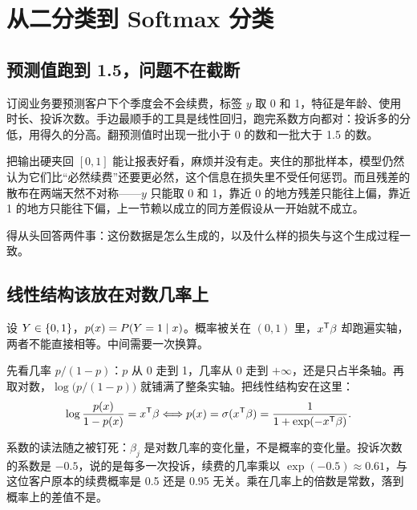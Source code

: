\section{从二分类到 Softmax 分类}
\label{sec:13-Machine-Learning/02-Linear-Models/03}

\subsection{预测值跑到 1.5，问题不在截断}

订阅业务要预测客户下个季度会不会续费，标签 \(y\) 取 0 和 1，特征是年龄、使用时长、投诉次数。手边最顺手的工具是线性回归，跑完系数方向都对：投诉多的分低，用得久的分高。翻预测值时出现一批小于 0 的数和一批大于 1.5 的数。

把输出硬夹回 \([0,1]\) 能让报表好看，麻烦并没有走。夹住的那批样本，模型仍然认为它们比``必然续费''还要更必然，这个信息在损失里不受任何惩罚。而且残差的散布在两端天然不对称——\(y\) 只能取 0 和 1，靠近 0 的地方残差只能往上偏，靠近 1 的地方只能往下偏，上一节赖以成立的同方差假设从一开始就不成立。

得从头回答两件事：这份数据是怎么生成的，以及什么样的损失与这个生成过程一致。

\subsection{线性结构该放在对数几率上}

设 \(Y\in\left\{0,1\right\}\)，\(p(x)=P(Y=1\mid x)\)。概率被关在 \((0,1)\) 里，\(x^{\mathsf{T}}\beta\) 却跑遍实轴，两者不能直接相等。中间需要一次换算。

先看几率 \(p/(1-p)\)：\(p\) 从 0 走到 1，几率从 0 走到 \(+\infty\)，还是只占半条轴。再取对数，\(\log\bigl(p/(1-p)\bigr)\) 就铺满了整条实轴。把线性结构安在这里：
\[
\log\frac{p(x)}{1-p(x)}=x^{\mathsf{T}}\beta
\space\Longleftrightarrow\space
p(x)=\sigma(x^{\mathsf{T}}\beta)=\frac{1}{1+\exp(-x^{\mathsf{T}}\beta)} .
\]

系数的读法随之被钉死：\(\beta_j\) 是对数几率的变化量，不是概率的变化量。投诉次数的系数是 \(-0.5\)，说的是每多一次投诉，续费的几率乘以 \(\exp(-0.5)\approx 0.61\)，与这位客户原本的续费概率是 0.5 还是 0.95 无关。乘在几率上的倍数是常数，落到概率上的差值不是。

